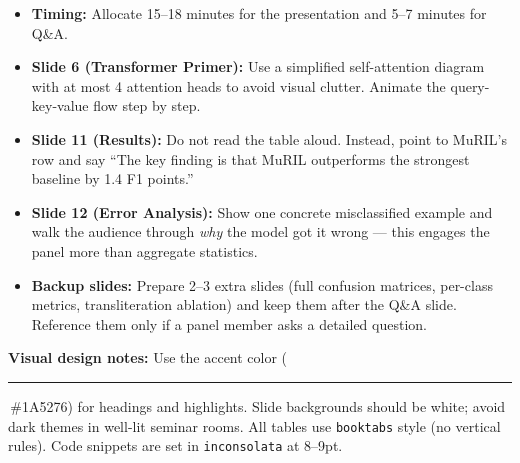 \documentclass[12pt,a4paper]{report}
\newenvironment{rvsummary}
  {\par\vspace{6pt}\noindent\begin{tcolorbox}[
    colback=accent!5,
    colframe=accent!30,
    boxrule=0.5pt,
    arc=4pt,
    left=10pt,
    right=10pt,
    top=8pt,
    bottom=8pt,
  ]\small}
  {\end{tcolorbox}\vspace{4pt}}
\begin{document}
\begin{itemize}[itemsep=4pt]
  \item \textbf{Timing:} Allocate 15--18 minutes for the presentation and 5--7 minutes for Q\&A.
  \item \textbf{Slide 6 (Transformer Primer):} Use a simplified self-attention diagram with at most 4 attention heads to avoid visual clutter. Animate the query-key-value flow step by step.
  \item \textbf{Slide 11 (Results):} Do not read the table aloud. Instead, point to MuRIL's row and say ``The key finding is that MuRIL outperforms the strongest baseline by 1.4 F1 points.''
  \item \textbf{Slide 12 (Error Analysis):} Show one concrete misclassified example and walk the audience through \emph{why} the model got it wrong — this engages the panel more than aggregate statistics.
  \item \textbf{Backup slides:} Prepare 2--3 extra slides (full confusion matrices, per-class metrics, transliteration ablation) and keep them after the Q\&A slide. Reference them only if a panel member asks a detailed question.
\end{itemize}

\vspace{12pt}
\begin{rvsummary}
\textbf{Visual design notes:} Use the accent color (\textcolor{accent}{\rule{8pt}{8pt}}\,\#1A5276) for headings and highlights. Slide backgrounds should be white; avoid dark themes in well-lit seminar rooms. All tables use \texttt{booktabs} style (no vertical rules). Code snippets are set in \texttt{inconsolata} at 8--9pt.
\end{rvsummary}
\end{document}
